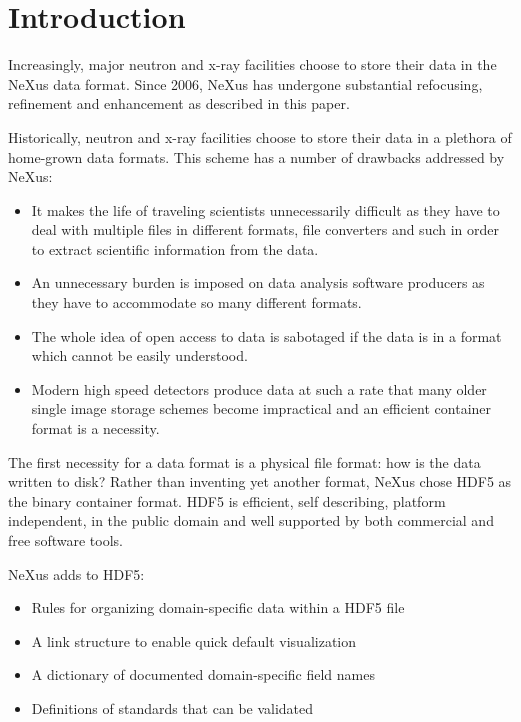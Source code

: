 \documentclass[%
 aip,
rsi,
 amsmath,amssymb,
 reprint,%
]{revtex4-1}
\begin{document}
\maketitle


\section{Introduction}
Increasingly, major neutron and x-ray facilities choose to store their data in the NeXus data format. 
Since 2006, NeXus\cite{nxold} has undergone substantial refocusing, 
refinement and enhancement as described in this paper.  

Historically, neutron and x-ray facilities choose to store their data in a plethora of 
home-grown data formats. This scheme has a number of drawbacks addressed by NeXus: 
\begin{itemize}
\item It makes the life of traveling scientists unnecessarily difficult as they have to deal with multiple files 
 in different formats, file converters and such in order to extract scientific information from the data.
 \item An unnecessary burden is imposed on data analysis software producers as they have to accommodate so many different formats.  
\item The whole idea of open access to data is sabotaged if the data is in a format which cannot be easily understood.
\item Modern high speed detectors produce data at such a rate that many older single image storage schemes become impractical and 
 an efficient container format is a necessity. 
\end{itemize}

The first necessity for a data format is a physical file format: how is the data written to disk? Rather than inventing  
yet another format, NeXus chose HDF5\cite{hdf5} as the binary container format. HDF5 is efficient, self describing, 
platform independent, in the public domain and well supported by both commercial and free software tools. 

NeXus adds to HDF5:
\begin{itemize}
\item Rules for organizing domain-specific data within a HDF5 file
\item A link structure to enable quick default visualization
\item A dictionary of documented domain-specific field names
\item Definitions of standards that can be validated
\end{itemize}
\end{document}
